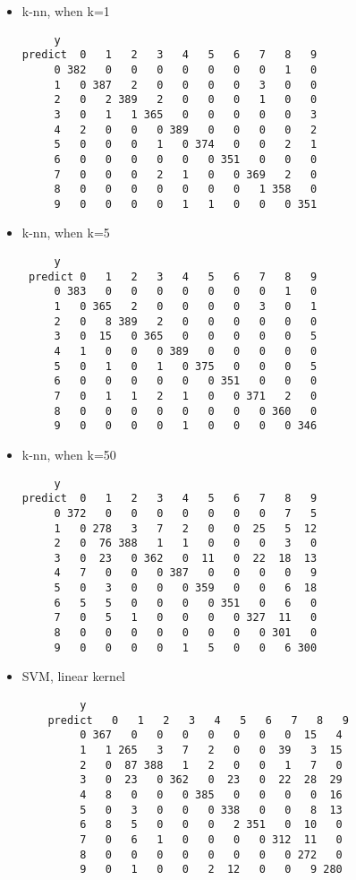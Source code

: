 \documentclass{article}
\begin{document}
\begin{itemize}
	\item k-nn, when k=1
	\begin{verbatim}
     y
predict  0   1   2   3   4   5   6   7   8   9
     0 382   0   0   0   0   0   0   0   1   0
     1   0 387   2   0   0   0   0   3   0   0
     2   0   2 389   2   0   0   0   1   0   0
     3   0   1   1 365   0   0   0   0   0   3
     4   2   0   0   0 389   0   0   0   0   2
     5   0   0   0   1   0 374   0   0   2   1
     6   0   0   0   0   0   0 351   0   0   0
     7   0   0   0   2   1   0   0 369   2   0
     8   0   0   0   0   0   0   0   1 358   0
     9   0   0   0   0   1   1   0   0   0 351
	\end{verbatim}
	
	\item k-nn, when k=5
	\begin{verbatim}
     y
 predict 0   1   2   3   4   5   6   7   8   9
     0 383   0   0   0   0   0   0   0   1   0
     1   0 365   2   0   0   0   0   3   0   1
     2   0   8 389   2   0   0   0   0   0   0
     3   0  15   0 365   0   0   0   0   0   5
     4   1   0   0   0 389   0   0   0   0   0
     5   0   1   0   1   0 375   0   0   0   5
     6   0   0   0   0   0   0 351   0   0   0
     7   0   1   1   2   1   0   0 371   2   0
     8   0   0   0   0   0   0   0   0 360   0
     9   0   0   0   0   1   0   0   0   0 346
	\end{verbatim}
	
	\item k-nn, when k=50
	\begin{verbatim}
     y
predict  0   1   2   3   4   5   6   7   8   9
     0 372   0   0   0   0   0   0   0   7   5
     1   0 278   3   7   2   0   0  25   5  12
     2   0  76 388   1   1   0   0   0   3   0
     3   0  23   0 362   0  11   0  22  18  13
     4   7   0   0   0 387   0   0   0   0   9
     5   0   3   0   0   0 359   0   0   6  18
     6   5   5   0   0   0   0 351   0   6   0
     7   0   5   1   0   0   0   0 327  11   0
     8   0   0   0   0   0   0   0   0 301   0
     9   0   0   0   0   1   5   0   0   6 300
	\end{verbatim}
	
	\item SVM, linear kernel
	\begin{verbatim}
	     y
	predict   0   1   2   3   4   5   6   7   8   9
	     0 367   0   0   0   0   0   0   0  15   4
	     1   1 265   3   7   2   0   0  39   3  15
	     2   0  87 388   1   2   0   0   1   7   0
	     3   0  23   0 362   0  23   0  22  28  29
	     4   8   0   0   0 385   0   0   0   0  16
	     5   0   3   0   0   0 338   0   0   8  13
	     6   8   5   0   0   0   2 351   0  10   0
	     7   0   6   1   0   0   0   0 312  11   0
	     8   0   0   0   0   0   0   0   0 272   0
	     9   0   1   0   0   2  12   0   0   9 280
	\end{verbatim}
	

\end{itemize}
\end{document}
